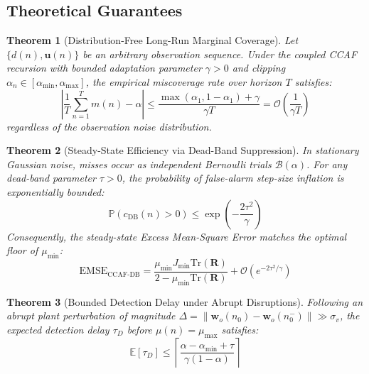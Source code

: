 \documentclass[journal,twocolumn]{IEEEtran}
\newtheorem{theorem}{Theorem}
\begin{document}
\subsection{Theoretical Guarantees}
\begin{theorem}[Distribution-Free Long-Run Marginal Coverage]
\label{thm:coverage}
Let $\{d(n), \mathbf{u}(n)\}$ be an arbitrary observation sequence. Under the coupled CCAF recursion with bounded adaptation parameter $\gamma > 0$ and clipping $\alpha_n \in [\alpha_{\min}, \alpha_{\max}]$, the empirical miscoverage rate over horizon $T$ satisfies:
\begin{equation}
    \left| \frac{1}{T} \sum_{n=1}^T m(n) - \alpha \right| \le \frac{\max(\alpha_1, 1-\alpha_1) + \gamma}{\gamma T} = \mathcal{O}\left(\frac{1}{\gamma T}\right)
\end{equation}
regardless of the observation noise distribution.
\end{theorem}

\begin{theorem}[Steady-State Efficiency via Dead-Band Suppression]
\label{thm:emse}
In stationary Gaussian noise, misses occur as independent Bernoulli trials $\mathcal{B}(\alpha)$. For any dead-band parameter $\tau > 0$, the probability of false-alarm step-size inflation is exponentially bounded:
\begin{equation}
    \mathbb{P}(c_{\text{DB}}(n) > 0) \le \exp\left( - \frac{2 \tau^2}{\gamma} \right)
\end{equation}
Consequently, the steady-state Excess Mean-Square Error matches the optimal floor of $\mu_{\min}$:
\begin{equation}
    \text{EMSE}_{\text{CCAF-DB}} = \frac{\mu_{\min} J_{\min} \text{Tr}(\mathbf{R})}{2 - \mu_{\min} \text{Tr}(\mathbf{R})} + \mathcal{O}\left( e^{-2\tau^2 / \gamma} \right)
\end{equation}
\end{theorem}

\begin{theorem}[Bounded Detection Delay under Abrupt Disruptions]
\label{thm:delay}
Following an abrupt plant perturbation of magnitude $\Delta = \|\mathbf{w}_o(n_0) - \mathbf{w}_o(n_0^-)\| \gg \sigma_v$, the expected detection delay $\tau_D$ before $\mu(n) = \mu_{\max}$ satisfies:
\begin{equation}
    \mathbb{E}[\tau_D] \le \left\lceil \frac{\alpha - \alpha_{\min} + \tau}{\gamma (1 - \alpha)} \right\rceil
\end{equation}
\end{theorem}
\end{document}
